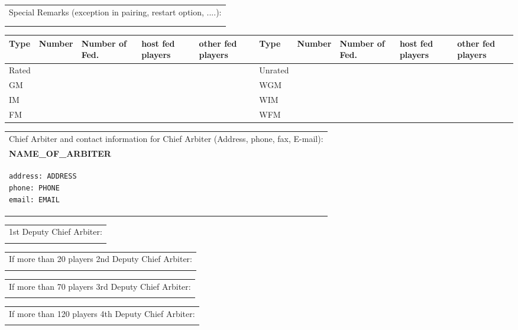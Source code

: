 \documentclass[11pt, a4paper]{article}
\begin{document}
\begin{table}[ht]
\noindent\begin{tabular}{|p{16.4cm}|}
Special Remarks (exception in pairing, restart option, ....):\\
\\
\\
\hline
\end{tabular}

\noindent\begin{tabular}{|p{1.3cm}|p{1.25cm}|p{1.25cm}|p{1.25cm}|p{1.25cm}|p{1.3cm}|p{1.25cm}|p{1.25cm}|p{1.25cm}|p{1.25cm}|}
Type&Number&Number of Fed.&host fed players&other fed players&Type&Number&Number of Fed.&host fed players&other fed players\\
\hline
Rated& & & & &Unrated& & & & \\
\hline
GM& & & & &WGM& & & & \\
\hline
IM& & & & &WIM& & & & \\
\hline
FM& & & & &WFM& & & & \\
\hline
\end{tabular}


\noindent\begin{tabular}{|p{16.4cm}|}
Chief Arbiter and contact information for Chief Arbiter (Address, phone, fax, E-mail):\\
{\normalsize\bfseries NAME_OF_ARBITER}\\
\begin{verbatim}
address: ADDRESS
phone: PHONE
email: EMAIL
\end{verbatim}
\\
\hline
\end{tabular}

\noindent\begin{tabular}{|p{16.4cm}|}
1st Deputy Chief Arbiter:\\
{\normalsize}\\
\hline
\end{tabular}

\noindent\begin{tabular}{|p{16.4cm}|}
If more than 20 players 2nd Deputy Chief Arbiter:\\
{\normalsize}\\
\hline
\end{tabular}

\noindent\begin{tabular}{|p{16.4cm}|}
If more than 70 players 3rd Deputy Chief Arbiter:\\
{\normalsize}\\
\hline
\end{tabular}

\noindent\begin{tabular}{|p{16.4cm}|}
If more than 120 players 4th Deputy Chief Arbiter:\\
{\normalsize}\\
\hline
\end{tabular}


\end{table}

\end{document}
